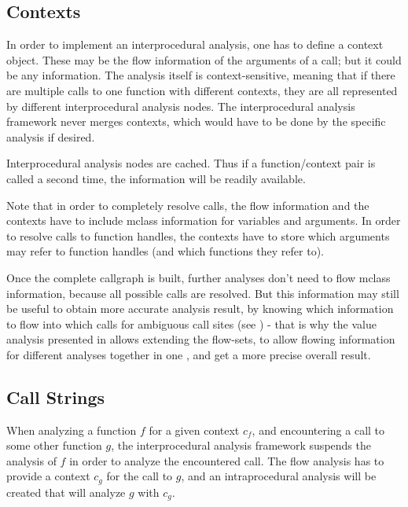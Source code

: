 
\subsection{Contexts}

In order to implement an interprocedural analysis, one has to define
a context object. These may be the flow information of the arguments
of a call; but it could be any information. The analysis itself
is context-sensitive, meaning that if there are multiple calls
to one function with different contexts, they are all represented
by different interprocedural analysis nodes. The interprocedural
analysis framework never merges contexts, which would have to be
done by the specific analysis if desired.

Interprocedural analysis nodes are cached. Thus if a function/context
pair is called a second time, the information will be readily available.

Note that in order to completely resolve calls, the flow information
and the contexts have to include mclass information for variables
and arguments. In order to resolve calls to function handles, the 
contexts have to store which arguments may refer to function handles
(and which functions they refer to).

Once the complete callgraph is built, further analyses
don't need to flow mclass information, because all possible calls
are resolved. But this information may still be useful
to obtain more accurate analysis result, by knowing
which information to flow into which calls for ambiguous
call sites (see ) - that is why the 
value analysis presented in 
allows extending the flow-sets, to allow flowing information
for different analyses together in one , and get a 
more precise overall result.


\subsection{Call Strings}
\label{sec:callstrings}

When analyzing a function $f$ for a given context $c_f$, and
encountering a call to some other function $g$, the interprocedural
analysis framework suspends the analysis of $f$ in order to analyze
the encountered call. The flow analysis has to provide a context $c_g$
for the call to $g$, and an intraprocedural analysis will be created
that will analyze $g$ with $c_g$. 

